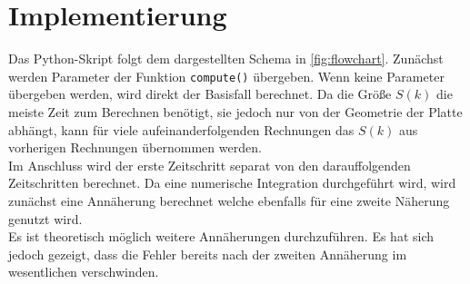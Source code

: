 \chapter[Implementierung (eigene Leistung)]{Implementierung}
\label{chap:Implementation}


Das Python-Skript folgt dem dargestellten Schema in \ref{fig:flowchart}. Zunächst werden Parameter der Funktion \texttt{compute()} übergeben. Wenn keine Parameter übergeben werden, wird direkt der Basisfall berechnet. Da die Größe $S(k)$ die meiste Zeit zum Berechnen benötigt, sie jedoch nur von der Geometrie der Platte abhängt, kann für viele aufeinanderfolgenden Rechnungen das $S(k)$ aus vorherigen Rechnungen übernommen werden.\\ 
Im Anschluss wird der erste Zeitschritt separat von den darauffolgenden Zeitschritten berechnet. Da eine numerische Integration durchgeführt wird, wird zunächst eine Annäherung berechnet welche ebenfalls für eine zweite Näherung genutzt wird.\\
Es ist theoretisch möglich weitere Annäherungen durchzuführen. Es hat sich jedoch gezeigt, dass die Fehler bereits nach der zweiten Annäherung im wesentlichen verschwinden.


